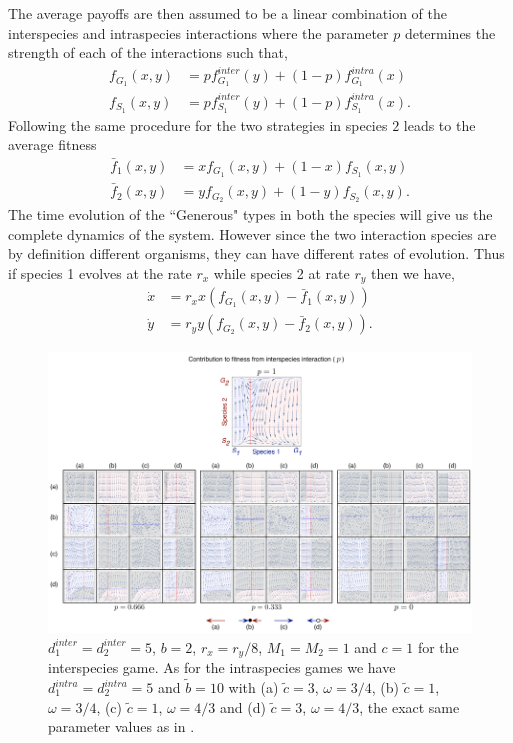 \documentclass[12pt]{article}
\begin{document}
\begin{appendices}
The average payoffs are then assumed to be a linear combination of the interspecies and intraspecies interactions where the parameter $p$ determines the strength of each of the interactions such that,
%
\begin{align}
	f_{G_1} (x,y) &= p f^{inter}_{G_1} (y) + (1-p) f^{intra}_{G_1} (x)  \\
	f_{S_1} (x,y) &= p f^{inter}_{S_1} (y) + (1-p) f^{intra}_{S_1} (x).
\label{fiteqs}
\end{align}
%
Following the same procedure for the two strategies in species $2$ leads to the average fitness
%
\begin{align}
\bar{f}_1 (x,y) &= x f_{G_1} (x,y)+(1-x) f_ {S_1}(x,y)  \\
\bar{f}_2 (x,y) &= y f_{G_2} (x,y)+(1-y) f_{S_2}(x,y).
\label{avgfiteqs}
\end{align}
%
The time evolution of the ``Generous" types in both the species will give us the complete dynamics of the system.
However since the two interaction species are by definition different organisms, they can have different rates of evolution.
Thus if species 1 evolves at the rate $r_x$ while species 2 at rate $r_y$ then we have,
\begin{align}
\dot{x} &= r_x x \left(f_{G_1}(x,y) -  \bar{f}_1(x,y) \right)  \\
\dot{y} &= r_y y \left(f_{G_2}(x,y) -  \bar{f}_2(x,y) \right).
\label{eq:repeqapp}
\end{align}


\begin{figure}
    \includegraphics[width=\columnwidth]{../Figures/Dynamicsacrossp_reduced.pdf}
    \caption{
$d_1^{inter} = d_2^{inter} = 5$, $b = 2$, $r_x = r_y/8$, $M_1 = M_2 = 1$ and $c=1$ for the interspecies game. As for the intraspecies games we have $d_1^{intra} = d_2^{intra} = 5$ and $\tilde{b} = 10 $ with 
(a) $\tilde{c} = 3$, $\omega = 3/4$, 
(b) $\tilde{c} = 1$, $\omega = 3/4$, 
(c) $\tilde{c} = 1$, $\omega = 4/3$ and 
(d) $\tilde{c} = 3$, $\omega = 4/3$, the exact same parameter values as in \citep{hauert:JTB:2006a}.
\label{fig:appendix}
}
\end{figure}



\end{appendices}
\end{document}
